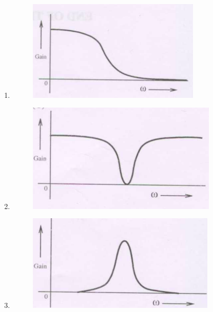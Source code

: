 \documentclass[journal,12pt,onecolumn]{IEEEtran}
\theoremstyle{remark}
\begin{document}
\begin{enumerate}[start=1, label=Q.\arabic*]
\begin{enumerate}
    \item 
    \begin{figure}[H]
        \includegraphics[width=\columnwidth]{Fig/q81-B.png}\caption{}
    \end{figure}

    
    \item 
    \begin{figure}[H]
        \includegraphics[width=\columnwidth]{Fig/q81-C.png}
        \caption{}
    \end{figure}


    \item 
    \begin{figure}[H]
        \includegraphics[width=\columnwidth]{Fig/q81-D.png}\caption{}
    \end{figure}





\end{enumerate}
\end{enumerate}
\end{document}
